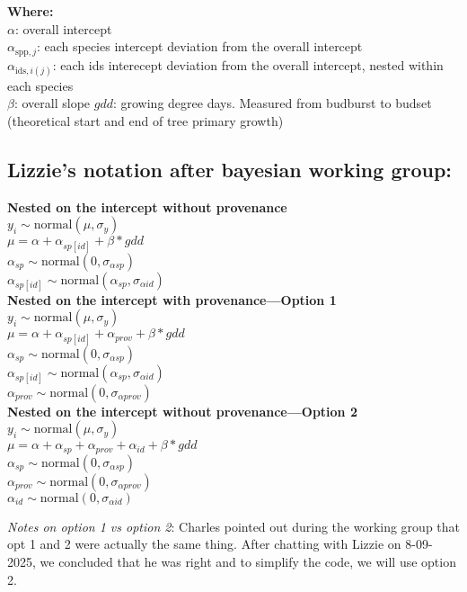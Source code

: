 \documentclass[a4paper,12pt]{article}
\begin{document}
\textbf{Where:} \\ 
$\alpha$: overall intercept \\ 
$\alpha_{\text{spp}, j}$: each species intercept deviation from the overall intercept\\ 
$\alpha_{\text{ids}, i(j)}$: each ids interecept deviation from the overall intercept, nested within each species\\
$\beta$: overall slope
$gdd$: growing degree days. Measured from budburst to budset (theoretical start and end of tree primary growth)

\subsection*{Lizzie's notation after bayesian working group:}
\textbf{Nested on the intercept without provenance}\\
$ y_i \sim \text{normal}(\mu, \sigma_y)$\\
$ \mu =  \alpha + \alpha_{sp[id]} + \beta*gdd$\\
$ \alpha_{sp} \sim \text{normal}(0, \sigma_{\alpha sp})$\\
$ \alpha_{sp[id]} \sim \text{normal}(\alpha_{sp}, \sigma_{\alpha id})$ \\

\textbf{Nested on the intercept with provenance---Option 1}\\
$ y_i \sim \text{normal}(\mu, \sigma_y)$\\
$ \mu =  \alpha + \alpha_{sp[id]} + \alpha_{prov} + \beta*gdd$\\
$ \alpha_{sp} \sim \text{normal}(0, \sigma_{\alpha sp})$\\
$ \alpha_{sp[id]} \sim \text{normal}(\alpha_{sp}, \sigma_{\alpha id})$\\
$ \alpha_{prov} \sim \text{normal}(0, \sigma_{\alpha prov})$ \\

\textbf{Nested on the intercept without provenance---Option 2}\\
$ y_i \sim \text{normal}(\mu, \sigma_y)$\\
$ \mu =  \alpha + \alpha_{sp} + \alpha_{prov} + \alpha_{id} +  \beta*gdd$\\
$ \alpha_{sp} \sim \text{normal}(0, \sigma_{\alpha sp})$\\
$ \alpha_{prov} \sim \text{normal}(0, \sigma_{\alpha prov})$\\
$ \alpha_{id} \sim \text{normal}(0, \sigma_{\alpha id})$

\textit{Notes on option 1 vs option 2}: Charles pointed out during the working group that opt 1 and 2 were actually the same thing. After chatting with Lizzie on 8-09-2025, we concluded that he was right and to simplify the code, we will use option 2.
\end{document}
